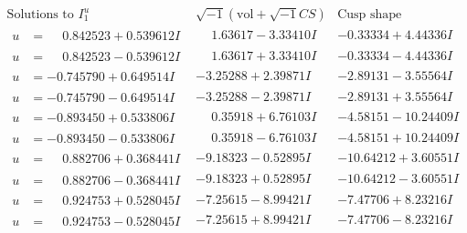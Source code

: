 \documentclass[1p]{elsarticle_modified}
\theoremstyle{definition}
\newcommand{\I}{\sqrt{-1}}
\begin{document}
$$\begin{array}{c|c|c}  
\text{Solutions to }I^u_{1}& \I (\text{vol} + \sqrt{-1}CS) & \text{Cusp shape}\\
 \hline 
\begin{aligned}
u &= \phantom{-}0.842523 + 0.539612 I\end{aligned}
 & \phantom{-}1.63617 - 3.33410 I & -0.33334 + 4.44336 I \\ \hline\begin{aligned}
u &= \phantom{-}0.842523 - 0.539612 I\end{aligned}
 & \phantom{-}1.63617 + 3.33410 I & -0.33334 - 4.44336 I \\ \hline\begin{aligned}
u &= -0.745790 + 0.649514 I\end{aligned}
 & -3.25288 + 2.39871 I & -2.89131 - 3.55564 I \\ \hline\begin{aligned}
u &= -0.745790 - 0.649514 I\end{aligned}
 & -3.25288 - 2.39871 I & -2.89131 + 3.55564 I \\ \hline\begin{aligned}
u &= -0.893450 + 0.533806 I\end{aligned}
 & \phantom{-}0.35918 + 6.76103 I & -4.58151 - 10.24409 I \\ \hline\begin{aligned}
u &= -0.893450 - 0.533806 I\end{aligned}
 & \phantom{-}0.35918 - 6.76103 I & -4.58151 + 10.24409 I \\ \hline\begin{aligned}
u &= \phantom{-}0.882706 + 0.368441 I\end{aligned}
 & -9.18323 - 0.52895 I & -10.64212 + 3.60551 I \\ \hline\begin{aligned}
u &= \phantom{-}0.882706 - 0.368441 I\end{aligned}
 & -9.18323 + 0.52895 I & -10.64212 - 3.60551 I \\ \hline\begin{aligned}
u &= \phantom{-}0.924753 + 0.528045 I\end{aligned}
 & -7.25615 - 8.99421 I & -7.47706 + 8.23216 I \\ \hline\begin{aligned}
u &= \phantom{-}0.924753 - 0.528045 I\end{aligned}
 & -7.25615 + 8.99421 I & -7.47706 - 8.23216 I \\ \hline\begin{aligned}

\end{aligned}
\end{array}$$
\end{document}
